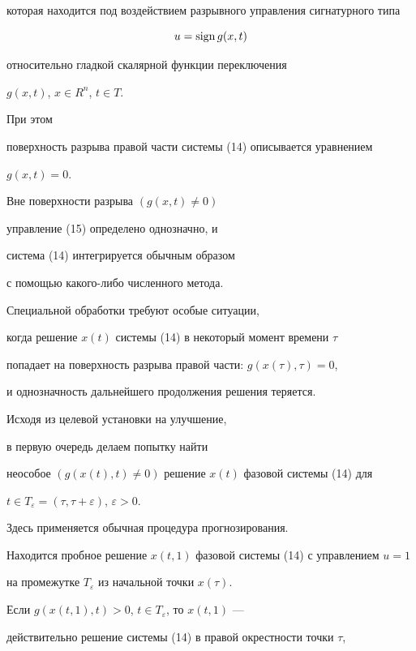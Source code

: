 которая находится под воздействием разрывного управления сигнатурного типа


\begin{equation}


u=\sign g(x,t)


\end{equation} 	 					


относительно гладкой скалярной функции переключения 


$g(x,t)$, $x\in R^n$, $t\in T$.


При этом 


поверхность разрыва правой части системы (14) описывается уравнением 


$g(x,t)=0$.


	


Вне поверхности разрыва $(g(x,t)\neq 0)$ 


управление (15) определено однозначно, и 


система (14) интегрируется обычным образом 


с помощью какого-либо численного метода. 


Специальной обработки требуют особые ситуации, 


когда решение $x(t)$ системы (14) в некоторый момент времени $\tau$ 


попадает на поверхность разрыва правой части: $g(x(\tau),\tau)=0$, 


и однозначность дальнейшего продолжения решения теряется.





Исходя из целевой установки на улучшение, 


в первую очередь делаем попытку найти 


неособое $(g(x(t),t)\neq 0)$ решение $x(t)$ фазовой системы (14) для


$t\in T_{\varepsilon}=(\tau,\tau+\varepsilon)$, $\varepsilon>0$. 


Здесь применяется обычная процедура прогнозирования.





Находится пробное решение $x(t,1)$ фазовой системы (14) с управлением $u=1$


на промежутке $T_{\varepsilon}$ из начальной точки $x(\tau)$. 


Если $g(x(t,1),t)>0$, $t\in T_{\varepsilon}$, то $x(t,1)$ --- 


действительно решение системы (14) в правой окрестности точки $\tau$, 


